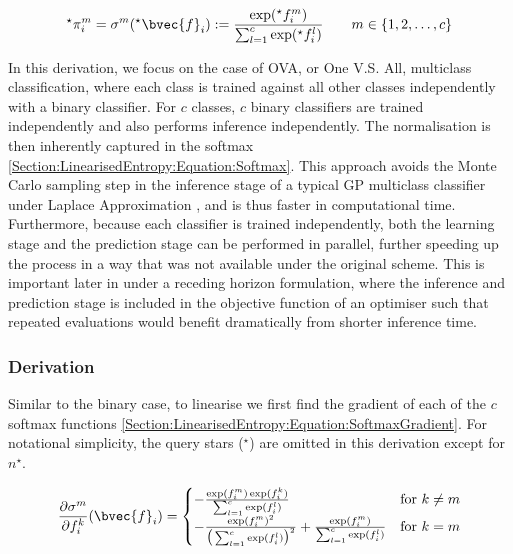 \documentclass{article}
\begin{document}
		\begin{equation}
			^{\star}\pi^{m}_{i} = \sigma^{m}(^{\star}\bvec{f}_{i}) := \frac{\exp(^{\star}f^{m}_{i})}{\sum_{l = 1}^{c} \exp(^{\star}f^{l}_{i})} \qquad m \in \{1, 2, \dots, c\}
		\label{Section:LinearisedEntropy:Equation:Softmax}
		\end{equation}
		
		In this derivation, we focus on the case of OVA, or One V.S. All, multiclass classification, where each class is trained against all other classes independently with a binary classifier. For $c$ classes, $c$ binary classifiers are trained independently and also performs inference independently. The normalisation is then inherently captured in the softmax \eqref{Section:LinearisedEntropy:Equation:Softmax}. This approach avoids the Monte Carlo sampling step in the inference stage of a typical GP multiclass classifier under Laplace Approximation \cite{GaussianProcessForMachineLearning}, and is thus faster in computational time. Furthermore, because each classifier is trained independently, both the learning stage and the prediction stage can be performed in parallel, further speeding up the process in a way that was not available under the original scheme. This is important later in under a receding horizon formulation, where the inference and prediction stage is included in the objective function of an optimiser such that repeated evaluations would benefit dramatically from shorter inference time.
		
		\subsubsection{Derivation}
		
			Similar to the binary case, to linearise we first find the gradient of each of the $c$ softmax functions \eqref{Section:LinearisedEntropy:Equation:SoftmaxGradient}. For notational simplicity, the query stars ($^{\star}$) are omitted in this derivation except for $n^{\star}$.
			
			\begin{equation}
				\frac{\partial \sigma^{m}}{\partial f^{k}_{i}}(\bvec{f}_{i}) =
				\begin{cases} 
					- \frac{\exp(f^{m}_{i}) \exp(f^{k}_{i})}{\sum_{l = 1}^{c} \exp(f^{l}_{i})} & \text{for } k \neq m  \\
					- \frac{\exp(f^{m}_{i})^{2}}{\big(\sum_{l = 1}^{c} \exp(f^{l}_{i})\big)^{2}} + \frac{\exp(f^{m}_{i})}{\sum_{l = 1}^{c} \exp(f^{l}_{i})}& \text{for } k = m
				\end{cases}
			\label{Section:LinearisedEntropy:Equation:SoftmaxGradient}
			\end{equation}			
		
\end{document}
